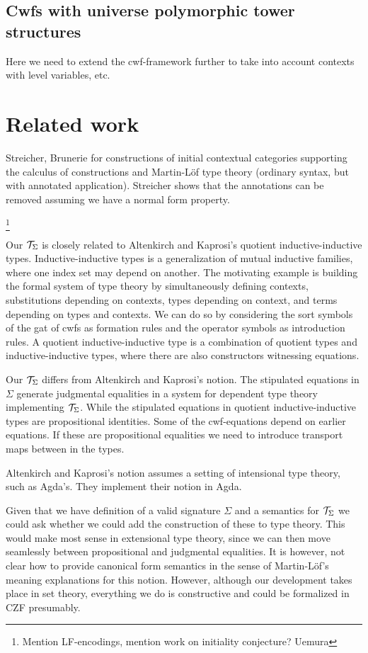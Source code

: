 \documentclass{lmcs}
\begin{document}
\subsection{Cwfs with universe polymorphic tower structures} Here we need to extend the cwf-framework further to take into account contexts with level variables, etc.

\section{Related work}

Streicher, Brunerie for constructions of initial contextual categories supporting the calculus of constructions and Martin-Löf type theory (ordinary syntax, but with annotated application). Streicher shows that the annotations can be removed assuming we have a normal form property.

\footnote{Mention LF-encodings, mention work on initiality conjecture? Uemura}

Our ${\mathcal T}_\Sigma$ is closely related to Altenkirch and Kaprosi's quotient inductive-inductive types. Inductive-inductive types \cite{nordvallforsberg:phd} is a generalization of mutual inductive families, where one index set may depend on another. The motivating example is building the formal system of type theory by simultaneously defining contexts, substitutions depending on contexts, types depending on context, and terms depending on types and contexts. We can do so by considering the sort symbols of the gat of cwfs as formation rules and the operator symbols as introduction rules. A quotient inductive-inductive type is a combination of quotient types and inductive-inductive types, where there are also constructors witnessing equations. 

Our ${\mathcal T}_\Sigma$ differs from Altenkirch and Kaprosi's notion. The stipulated equations in $\Sigma$ generate judgmental equalities in a system for dependent type theory implementing ${\mathcal T}_\Sigma$. While the stipulated equations in quotient inductive-inductive types are propositional identities. Some of the cwf-equations depend on earlier equations. If these are propositional equalities we need to introduce transport maps between in the types. 

Altenkirch and Kaprosi's notion assumes a setting of intensional type theory, such as Agda's. They implement their notion in Agda.

Given that we have definition of a valid signature $\Sigma$ and a semantics for ${\mathcal T}_\Sigma$ we could ask whether we could add the construction of these to type theory. This would make most sense in extensional type theory, since we can then move seamlessly between propositional and judgmental equalities. It is however, not clear how to provide canonical form semantics in the sense of Martin-Löf's meaning explanations for this notion. However, although our development takes place in set theory, everything we do is constructive and could be formalized in CZF presumably.



%
\end{document}
